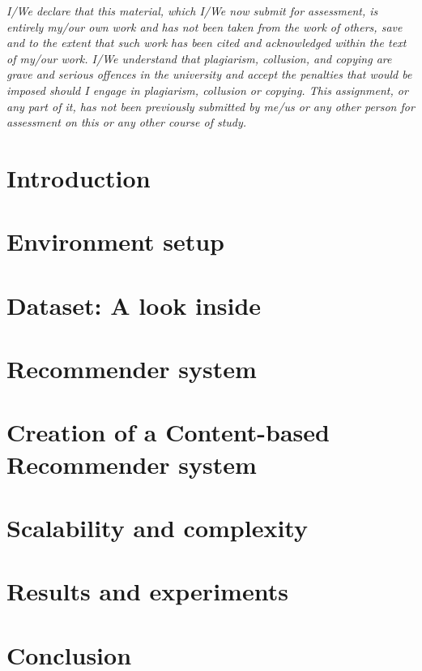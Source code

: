 \documentclass[12pt,english]{report}
\begin{document}
\frontespizio
{}
\textit{I/We declare that this material, which I/We now submit for assessment, is entirely my/our own work and has not been taken from the work of others, save and to the extent that such work has been cited and acknowledged within the text of my/our work. I/We understand that plagiarism, collusion, and copying are grave and serious offences in the university and accept the penalties that would be imposed should I engage in plagiarism, collusion or copying. This assignment, or any part of it, has not been previously submitted by me/us or any other person for assessment on this or any other course of study.}

\afterpreface

% 
% 

\chapter{Introduction}\label{cap:introduction}
\chapter{Environment setup}\label{cap:environment}
\chapter{Dataset: A look inside}\label{cap:dataset}
\chapter{Recommender system}\label{cap:recsys}
\chapter{Creation of a Content-based Recommender system}\label{cap:recsyscontbased}
\chapter{Scalability and complexity}\label{cap:scalability}
\chapter{Results and experiments}\label{cap:results}
\chapter{Conclusion}\label{cap:conclusion}
\end{document}
